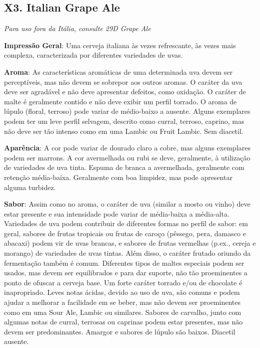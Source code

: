 \subsection*{X3. Italian Grape Ale}

\textit{Para uso fora da Itália, consulte 29D Grape Ale}

\textbf{Impressão Geral}: Uma cerveja italiana às vezes refrescante, às vezes mais complexa, caracterizada por diferentes variedades de uvas.

\textbf{Aroma}: As características aromáticas de uma determinada uva devem ser perceptíveis, mas não devem se sobrepor aos outros aromas. O caráter da uva deve ser agradável e não deve apresentar defeitos, como oxidação. O caráter de malte é geralmente contido e não deve exibir um perfil torrado. O aroma de lúpulo (floral, terroso) pode variar de médio-baixo a ausente. Alguns exemplares podem ter um leve perfil selvagem, descrito como curral, terroso, caprino, mas não deve ser tão intenso como em uma Lambic ou Fruit Lambic. Sem diacetil.

\textbf{Aparência}: A cor pode variar de dourado claro a cobre, mas alguns exemplares podem ser marrons. A cor avermelhada ou rubi se deve, geralmente, à utilização de variedades de uva tinta. Espuma de branca a avermelhada, geralmente com retenção média-baixa. Geralmente com boa limpidez, mas pode apresentar alguma turbidez.

\textbf{Sabor}: Assim como no aroma, o caráter de uva (similar a mosto ou vinho) deve estar presente e sua intensidade pode variar de média-baixa a média-alta. Variedades de uva podem contribuir de diferentes formas no perfil de sabor: em geral, sabores de frutas tropicais ou frutas de caroço (pêssego, pera, damasco e abacaxi) podem vir de uvas brancas, e sabores de frutas vermelhas (p.ex., cereja e morango) de variedades de uvas tintas. Além disso, o caráter frutado oriundo da fermentação também é comum. Diferentes tipos de maltes especiais podem ser usados, mas devem ser equilibrados e para dar suporte, não tão proeminentes a ponto de ofuscar a cerveja base. Um forte caráter torrado e/ou de chocolate é inapropriado. Leves notas ácidas, devido ao uso de uva, são comuns e podem ajudar a melhorar a facilidade em se beber, mas não devem ser proeminentes como em uma Sour Ale, Lambic ou similares. Sabores de carvalho, junto com algumas notas de curral, terrosas ou caprinas podem estar presentes, mas não devem ser predominantes. Amargor e sabores de lúpulo são baixos. Diacetil ausente.

